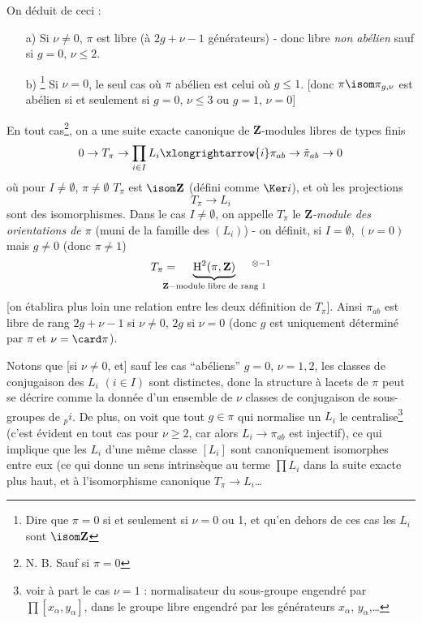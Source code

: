 On déduit de ceci : 
\begin{enumerate}
    \item[a)] Si $\nu \neq 0$, $\pi$ est libre (à $2g + \nu - 1$ générateurs) - donc libre \emph{non abélien} sauf si $g = 0$, $\nu \leq 2$. 
    \item[b)]\footnote{Dire que $\pi = 0$ si et seulement si $\nu = 0$ ou 1, et qu'en dehors de ces cas les $L_i$ sont $\isom \mathbf{Z}$} Si $\nu = 0$, le seul cas où $\pi$ abélien est celui où $g \leq 1$. [donc $\pi \isom \pi_{g, \nu}$ est abélien si et seulement si $g = 0$, $\nu \leq 3$ ou $g = 1$, $\nu = 0$]
\end{enumerate}
En tout cas\footnote{N. B. Sauf si $\pi = 0$}, on a une suite exacte canonique de $\mathbf{Z}$-modules libres de types finis
$$
0 \to T_\pi \to \prod_{i \in I} L_i \xlongrightarrow{i} \pi_{ab} \to \tilde{\pi}_{ab} \to 0
$$
où pour $I \neq \emptyset$, $\pi \neq \emptyset$ $T_\pi$ est $\isom \mathbf{Z}$ (défini comme $\Ker i$), et où les projections
$$
T_\pi \to L_i
$$
sont des isomorphismes. Dans le cas $I \neq \emptyset$, on appelle $T_\pi$ le \emph{$\mathbf{Z}$-module des orientations de $\pi$} (muni de la famille des $(L_i)$) - on définit, si $I = \emptyset$, $(\nu = 0)$ mais $g \neq 0$ (donc $\pi \neq 1$)
$$
T_\pi = \underbrace{\mathrm{H}^2(\pi, \mathbf{Z})}_{\hspace*{-5mm}\mathbf{Z}-\text{module libre de rang 1}\hspace*{-5mm}}{}^{\otimes - 1}
$$
[on établira plus loin une relation entre les deux définition de $T_\pi$]. Ainsi $\pi_{ab}$ est libre de rang $2g + \nu - 1$ si $\nu \neq 0$, $2g$ si $\nu = 0$ (donc $g$ est uniquement déterminé par $\pi$ et $\nu = \card \pi$).

Notons que [si $\nu \neq 0$, et] sauf les cas ``abéliens'' $g = 0$, $\nu = 1, 2$, les classes de conjugaison des $L_i$ $(i \in I)$ sont distinctes, donc la structure à lacets de $\pi$ peut se décrire comme la donnée d'un ensemble de $\nu$ classes de conjugaison de sous-groupes de $_p i$. De plus, on voit que tout $g \in \pi$ qui normalise un $L_i$ le centralise\footnote{voir à part le cas $\nu = 1$ : normalisateur du sous-groupe engendré par $\prod [x_\alpha, y_\alpha]$, dans le groupe libre engendré par les générateurs $x_\alpha$, $y_\alpha$,\dots} (c'est évident en tout cas pour $\nu \geq 2$, car alors $L_i \to \pi_{ab}$ est injectif), ce qui implique que les $L_i$ d'une même classe $[L_i]$ sont canoniquement isomorphes entre eux (ce qui donne un sens intrinsèque au terme $\prod L_i$ dans la suite exacte plus haut, et à l'isomorphisme canonique $T_\pi \to L_i$\dots

